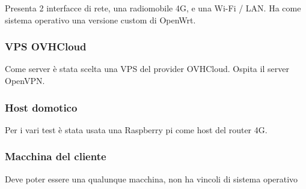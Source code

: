 Presenta 2 interfacce di rete, una radiomobile 4G, e una Wi-Fi / LAN.
Ha come sistema operativo una versione custom di OpenWrt.

\subsubsection{VPS OVHCloud}

Come server \`e stata scelta una VPS del provider OVHCloud.
Ospita il server OpenVPN.

\subsubsection{Host domotico}

Per i vari test \`e stata usata una Raspberry pi come host del router 4G.

\subsubsection{Macchina del cliente}

Deve poter essere una qualunque macchina, non ha vincoli di sistema operativo